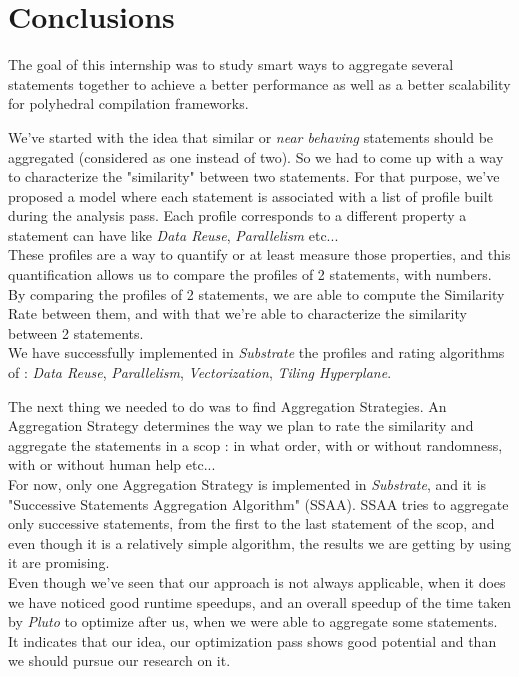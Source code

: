 \documentclass[paper=a4, fontsize=11.5pt]{scrartcl}
\numberwithin{equation}{section}        %
\numberwithin{figure}{section}          %
\numberwithin{table}{section}               %
\begin{document}
    
\section{Conclusions}
The goal of this internship was to study smart ways to aggregate several statements
together to achieve a better performance as well as a better scalability for polyhedral
compilation frameworks.

\bigskip

We've started with the idea that similar or \textit{near behaving} statements should be
aggregated (considered as one instead of two). So we had to come up with a way to characterize
the "similarity" between two statements. For that purpose, we've proposed a model where
each statement is associated with a list of profile built during the analysis pass.
Each profile corresponds to a different property a statement can have like \textit{Data Reuse},
\textit{Parallelism} etc...\\
These profiles are a way to quantify or at least measure those properties, and this quantification
allows us to compare the profiles of 2 statements, with numbers. By comparing the profiles
of 2 statements, we are able to compute the Similarity Rate between them, and with that we're
able to characterize the similarity between 2 statements.\\
We have successfully implemented in \textit{Substrate} the profiles and rating algorithms of :
\textit{Data Reuse}, \textit{Parallelism}, \textit{Vectorization}, \textit{Tiling Hyperplane}.

The next thing we needed to do was to find Aggregation Strategies. An Aggregation Strategy
determines the way we plan to rate the similarity and aggregate the statements in a scop : in what
order, with or without randomness, with or without human help etc...\\
For now, only one Aggregation Strategy is implemented in \textit{Substrate},
and it is "Successive Statements Aggregation Algorithm" (SSAA).
SSAA tries to aggregate only successive statements, from the first to the last
statement of the scop, and even though it is a relatively simple algorithm, the results we
are getting by using it are promising.\\
Even though we've seen that our approach is not always applicable, when it does
we have noticed good runtime speedups, and an overall speedup of the time taken by \textit{Pluto}
to optimize after us, when we were able to aggregate some statements. It indicates that our idea,
our optimization pass shows good potential and than we should pursue our research on it.
\end{document}
